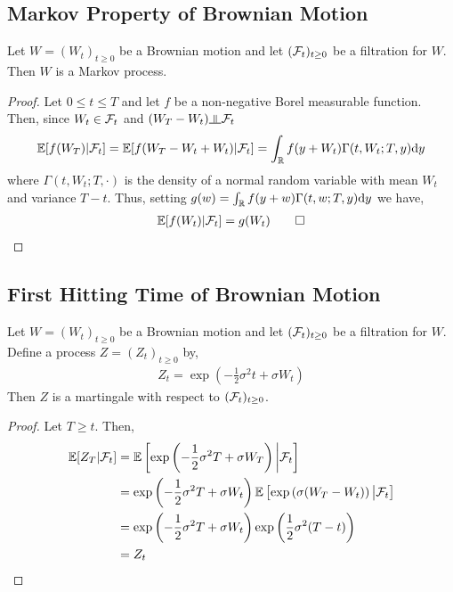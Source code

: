\documentclass[12pt]{article}
\begin{document}
\subsection{Markov Property of Brownian Motion}
\begin{theorem}
Let \( W = (W_t)_{t\geq 0} \) be a Brownian motion and let \( (\mathcal{F}_t)_{t\geq 0} \) be a filtration for \( W \). Then \( W \) is a Markov process.
\end{theorem}

\begin{proof}
Let \( 0\leq t\leq T \) and let \( f \) be a non-negative Borel measurable function. Then, since \( W_t\in\mathcal{F}_t \) and \( (W_T-W_t) \indep \cF_t \)
\begin{align*}
    \mathbb{E}[f(W_T) | \mathcal{F}_t] = \mathbb{E}[f(W_T - W_t+W_t) | \mathcal{F}_t]
    = \int_{\mathbb{R}} f(y+ W_t) \Gamma(t,W_t;T,y) \mathrm{d} y
\end{align*}
where \( \Gamma(t,W_t;T,\cdot) \) is the density of a normal random variable with mean \( W_t \) and variance \( T-t \).
Thus, setting \( g(w) =  \int_{\mathbb{R}} f(y+ w) \Gamma(t,w;T,y) \mathrm{d} y \) we have,
\begin{align*}
    \EE[f(W_t) | \cF_t] = g(W_t) \tag*{\qed}
\end{align*}
\end{proof}

\subsection{First Hitting Time of Brownian Motion}

\begin{theorem}
Let \( W = (W_t)_{t\geq 0} \) be a Brownian motion and let \( (\mathcal{F}_t)_{t\geq 0} \) be a filtration for \( W \). Define a process \( Z = (Z_t)_{t\geq 0} \) by,
\begin{align*}
    Z_t = \exp\left(-\frac{1}{2}\sigma^2 t + \sigma W_t\right)
\end{align*}
Then \( Z \) is a martingale with respect to \( (\mathcal{F}_t)_{t\geq 0} \).
\end{theorem}

\begin{proof}
Let \( T\geq t \). Then,
\begin{align*}
    \mathbb{E}[Z_T | \mathcal{F}_t]
    &= \mathbb{E} \left[ \exp \left( -\frac{1}{2}\sigma^2 T + \sigma W_T \right) \bigg| \mathcal{F}_t \right]
    \\&= \exp\left( -\frac{1}{2}\sigma^2 T + \sigma W_t \right) \mathbb{E} \left[ \exp \left(\sigma (W_T -W_t)\right) \big| \mathcal{F}_t \right]
    \\&= \exp\left( -\frac{1}{2}\sigma^2 T + \sigma W_t \right) \exp \left( \frac{1}{2}\sigma^2(T-t) \right)
    \\&= Z_t
\end{align*}
\end{proof}
\end{document}
